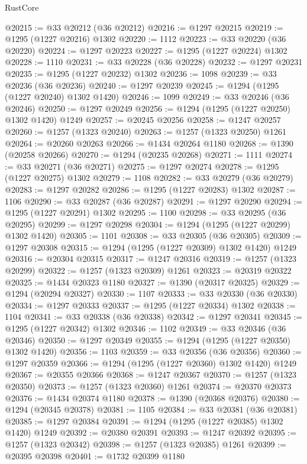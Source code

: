 \begin{lexlean}{RustCore}
\begin{coremodule}
@20215 := @33 @20212 (@36 @20212)
@20216 := @1297 @20215
@20219 := @1295 (@1227 @20216) @1302
@20220 := 1112
@20223 := @33 @20220 (@36 @20220)
@20224 := @1297 @20223
@20227 := @1295 (@1227 @20224) @1302
@20228 := 1110
@20231 := @33 @20228 (@36 @20228)
@20232 := @1297 @20231
@20235 := @1295 (@1227 @20232) @1302
@20236 := 1098
@20239 := @33 @20236 (@36 @20236)
@20240 := @1297 @20239
@20245 := @1294 (@1295 (@1227 @20240) @1302 @1420)
@20246 := 1099
@20249 := @33 @20246 (@36 @20246)
@20250 := @1297 @20249
@20256 := @1294 (@1295 (@1227 @20250) @1302 @1420) @1249
@20257 := @20245 @20256
@20258 := @1247 @20257
@20260 := @1257 (@1323 @20240)
@20263 := @1257 (@1323 @20250) @1261
@20264 := @20260 @20263
@20266 := @1434 @20264 @1180
@20268 := @1390 (@20258 @20266)
@20270 := @1294 (@20235 @20268)
@20271 := 1111
@20274 := @33 @20271 (@36 @20271)
@20275 := @1297 @20274
@20278 := @1295 (@1227 @20275) @1302
@20279 := 1108
@20282 := @33 @20279 (@36 @20279)
@20283 := @1297 @20282
@20286 := @1295 (@1227 @20283) @1302
@20287 := 1106
@20290 := @33 @20287 (@36 @20287)
@20291 := @1297 @20290
@20294 := @1295 (@1227 @20291) @1302
@20295 := 1100
@20298 := @33 @20295 (@36 @20295)
@20299 := @1297 @20298
@20304 := @1294 (@1295 (@1227 @20299) @1302 @1420)
@20305 := 1101
@20308 := @33 @20305 (@36 @20305)
@20309 := @1297 @20308
@20315 := @1294 (@1295 (@1227 @20309) @1302 @1420) @1249
@20316 := @20304 @20315
@20317 := @1247 @20316
@20319 := @1257 (@1323 @20299)
@20322 := @1257 (@1323 @20309) @1261
@20323 := @20319 @20322
@20325 := @1434 @20323 @1180
@20327 := @1390 (@20317 @20325)
@20329 := @1294 (@20294 @20327)
@20330 := 1107
@20333 := @33 @20330 (@36 @20330)
@20334 := @1297 @20333
@20337 := @1295 (@1227 @20334) @1302
@20338 := 1104
@20341 := @33 @20338 (@36 @20338)
@20342 := @1297 @20341
@20345 := @1295 (@1227 @20342) @1302
@20346 := 1102
@20349 := @33 @20346 (@36 @20346)
@20350 := @1297 @20349
@20355 := @1294 (@1295 (@1227 @20350) @1302 @1420)
@20356 := 1103
@20359 := @33 @20356 (@36 @20356)
@20360 := @1297 @20359
@20366 := @1294 (@1295 (@1227 @20360) @1302 @1420) @1249
@20367 := @20355 @20366
@20368 := @1247 @20367
@20370 := @1257 (@1323 @20350)
@20373 := @1257 (@1323 @20360) @1261
@20374 := @20370 @20373
@20376 := @1434 @20374 @1180
@20378 := @1390 (@20368 @20376)
@20380 := @1294 (@20345 @20378)
@20381 := 1105
@20384 := @33 @20381 (@36 @20381)
@20385 := @1297 @20384
@20391 := @1294 (@1295 (@1227 @20385) @1302 @1420) @1249
@20392 := @20380 @20391
@20393 := @1247 @20392
@20395 := @1257 (@1323 @20342)
@20398 := @1257 (@1323 @20385) @1261
@20399 := @20395 @20398
@20401 := @1732 @20399 @1180

\end{coremodule}
\end{lexlean}
